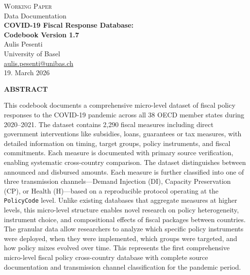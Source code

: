 \documentclass[12pt]{article}
\begin{document}
\begin{titlepage}
\begin{center}

\vspace*{0.5cm}
{\large \textsc{Working Paper}}\\[0.5cm]
{\large Data Documentation}\\[1.5cm]

{\LARGE \textbf{COVID-19 Fiscal Response Database:\\[0.3cm]
Codebook Version 1.7}}\\[2cm]

{\large 
Aulis Pesenti\\[0.2cm]
University of Basel\\[0.2cm]
\href{mailto:email@unibas.ch}{aulis.pesenti@unibas.ch}
}\\[2cm]

{\large 19. March 2026}\\[3cm]

\begin{minipage}{0.85\textwidth}
\begin{center}
\textbf{ABSTRACT}
\end{center}
\vspace{0.3cm}

This codebook documents a comprehensive micro-level dataset of fiscal policy responses to the COVID-19 pandemic across all 38 OECD member states during 2020--2021. The dataset contains 2,290 fiscal measures including direct government interventions like subsidies, loans, guarantees or tax measures, with detailed information on timing, target groups, policy instruments, and fiscal commitments. Each measure is documented with primary source verification, enabling systematic cross-country comparison. The dataset distinguishes between announced and disbursed amounts. Each measure is further classified into one of three transmission channels---Demand Injection (DI), Capacity Preservation (CP), or Health (H)---based on a reproducible protocol operating at the \texttt{PolicyCode} level. Unlike existing databases that aggregate measures at higher levels, this micro-level structure enables novel research on policy heterogeneity, instrument choice, and compositional effects of fiscal packages between countries. The granular data allow researchers to analyze which specific policy instruments were deployed, when they were implemented, which groups were targeted, and how policy mixes evolved over time. This represents the first comprehensive micro-level fiscal policy cross-country database with complete source documentation and transmission channel classification for the pandemic period.



\end{minipage}
\end{center}
\end{titlepage}
\end{document}
